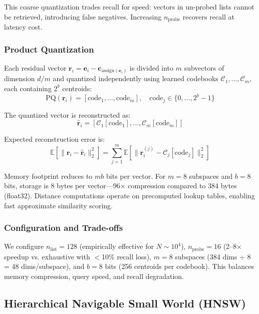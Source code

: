 \documentclass[conference]{IEEEtran}
\begin{document}
This coarse quantization trades recall for speed: vectors in un-probed lists cannot be retrieved, introducing false negatives. Increasing $n_{\mathrm{probe}}$ recovers recall at latency cost.

\subsubsection{Product Quantization}
Each residual vector $\mathbf{r}_i = \mathbf{e}_i - \mathbf{c}_{\mathrm{assign}(\mathbf{e}_i)}$ is divided into $m$ subvectors of dimension $d/m$ and quantized independently using learned codebooks $\mathcal{C}_1, \ldots, \mathcal{C}_m$, each containing $2^b$ centroids:
\begin{equation}
\mathrm{PQ}(\mathbf{r}_i) = [\mathrm{code}_1, \ldots, \mathrm{code}_m], \quad \mathrm{code}_j \in \{0, \ldots, 2^b{-}1\}
\label{eq:pq}
\end{equation}

The quantized vector is reconstructed as:
\begin{equation}
\hat{\mathbf{r}}_i = [\mathcal{C}_1[\mathrm{code}_1], \ldots, \mathcal{C}_m[\mathrm{code}_m]]
\label{eq:pq_reconstruct}
\end{equation}

Expected reconstruction error is:
\begin{equation}
\mathbb{E}[\|\mathbf{r}_i - \hat{\mathbf{r}}_i\|_2^2] = \sum_{j=1}^{m} \mathbb{E}[\|\mathbf{r}_i^{(j)} - \mathcal{C}_j[\mathrm{code}_j]\|_2^2]
\label{eq:pq_error}
\end{equation}

Memory footprint reduces to $mb$ bits per vector. For $m{=}8$ subspaces and $b{=}8$ bits, storage is 8 bytes per vector—96$\times$ compression compared to 384 bytes (float32). Distance computations operate on precomputed lookup tables, enabling fast approximate similarity scoring.

\subsubsection{Configuration and Trade-offs}
We configure $n_{\mathrm{list}}{=}128$ (empirically effective for $N{\sim}10^4$), $n_{\mathrm{probe}}{=}16$ (2--8$\times$ speedup vs. exhaustive with $<$10\% recall loss), $m{=}8$ subspaces (384 dims $\div$ 8 = 48 dims/subspace), and $b{=}8$ bits (256 centroids per codebook). This balances memory compression, query speed, and recall degradation.

\subsection{Hierarchical Navigable Small World (HNSW)}
\end{document}
